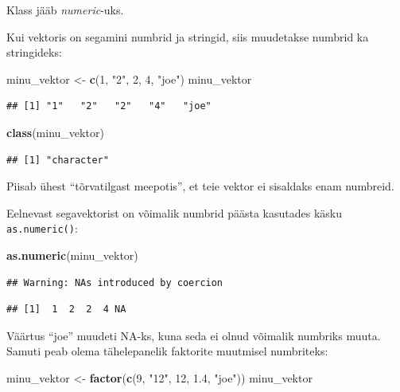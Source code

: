 \documentclass[]{book}
\newenvironment{Shaded}{\begin{snugshade}}{\end{snugshade}}
\newcommand{\KeywordTok}[1]{\textcolor[rgb]{0.13,0.29,0.53}{\textbf{#1}}}
\newcommand{\DecValTok}[1]{\textcolor[rgb]{0.00,0.00,0.81}{#1}}
\newcommand{\FloatTok}[1]{\textcolor[rgb]{0.00,0.00,0.81}{#1}}
\newcommand{\StringTok}[1]{\textcolor[rgb]{0.31,0.60,0.02}{#1}}
\newcommand{\NormalTok}[1]{#1}
\begin{document}
Klass jääb \emph{numeric}-uks.

Kui vektoris on segamini numbrid ja stringid, siis muudetakse numbrid ka
stringideks:

\begin{Shaded}
\begin{Highlighting}[]
\NormalTok{minu_vektor <-}\StringTok{ }\KeywordTok{c}\NormalTok{(}\DecValTok{1}\NormalTok{, }\StringTok{"2"}\NormalTok{, }\DecValTok{2}\NormalTok{, }\DecValTok{4}\NormalTok{, }\StringTok{"joe"}\NormalTok{)}
\NormalTok{minu_vektor}
\end{Highlighting}
\end{Shaded}

\begin{verbatim}
## [1] "1"   "2"   "2"   "4"   "joe"
\end{verbatim}

\begin{Shaded}
\begin{Highlighting}[]
\KeywordTok{class}\NormalTok{(minu_vektor)}
\end{Highlighting}
\end{Shaded}

\begin{verbatim}
## [1] "character"
\end{verbatim}

Piisab ühest ``tõrvatilgast meepotis'', et teie vektor ei sisaldaks enam
numbreid.

Eelnevast segavektorist on võimalik numbrid päästa kasutades käsku
\texttt{as.numeric()}:

\begin{Shaded}
\begin{Highlighting}[]
\KeywordTok{as.numeric}\NormalTok{(minu_vektor)}
\end{Highlighting}
\end{Shaded}

\begin{verbatim}
## Warning: NAs introduced by coercion
\end{verbatim}

\begin{verbatim}
## [1]  1  2  2  4 NA
\end{verbatim}

Väärtus ``joe'' muudeti NA-ks, kuna seda ei olnud võimalik numbriks
muuta. Samuti peab olema tähelepanelik faktorite muutmisel numbriteks:

\begin{Shaded}
\begin{Highlighting}[]
\NormalTok{minu_vektor <-}\StringTok{ }\KeywordTok{factor}\NormalTok{(}\KeywordTok{c}\NormalTok{(}\DecValTok{9}\NormalTok{, }\StringTok{"12"}\NormalTok{, }\DecValTok{12}\NormalTok{, }\FloatTok{1.4}\NormalTok{, }\StringTok{"joe"}\NormalTok{))}
\NormalTok{minu_vektor}
\end{Highlighting}
\end{Shaded}
\end{document}
